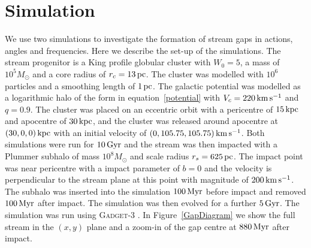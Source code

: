 \documentclass[useAMS,usenatbib,fleqn,a4paper]{mn2e}
\def\kpc{\,{\rm kpc}}
\def\pc{\,{\rm pc}}
\def\kms{\,{\rm km\,s^{-1}}}
\def\Gyr{\,{\rm Gyr}}
\def\Myr{\,{\rm Myr}}
\begin{document}
\section{Simulation}\label{Sect::Simulation}
We use two simulations to investigate the formation of stream gaps in actions, angles and frequencies. Here we describe the set-up of the simulations. The stream progenitor is a King profile globular cluster with $W_0=5$, a mass of $10^5 M_\odot$ and a core radius of $r_c=13\pc$. The cluster was modelled with $10^6$ particles and a smoothing length of $1\pc$.
The galactic potential was modelled as a logarithmic halo of the form in equation~\eqref{potential} with $V_c = 220\kms$ and $q = 0.9$. The cluster was placed on an eccentric orbit with a pericentre of $15\kpc$ and apocentre of $30\kpc$, and the cluster was released around apocentre at $(30,0,0)\kpc$ with an initial velocity of $(0, 105.75, 105.75)\kms$. Both simulations were run for $10\Gyr$ and the stream was then impacted with a Plummer subhalo of mass $10^8M_\odot$ and scale radius $r_s=625\pc$. The impact point was near pericentre with a impact parameter of $b=0$ and the velocity is perpendicular to the stream plane at this point with magnitude of $200\kms$. The subhalo was inserted into the simulation $100\Myr$ before impact and removed $100\Myr$ after impact. The simulation was then evolved for a further $5\Gyr$. The simulation was run using \textsc{Gadget-3} \citep[which is an improved version of \textsc{Gadget-2},][]{Gadget2}. In Figure~\ref{GapDiagram} we show the full stream in the $(x,y)$ plane and a zoom-in of the gap centre at $880\Myr$ after impact.
\end{document}
